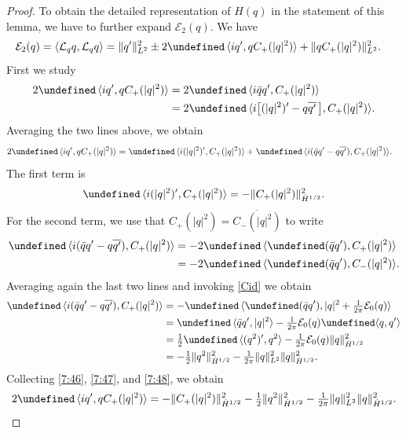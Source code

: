 \documentclass{amsart}
\numberwithin{equation}{section}
\theoremstyle{definition}
\newcommand{\Lc}{\mathcal{L}}
\newcommand{\lan}{\langle}
\newcommand{\ran}{\rangle}
\let\Re=\undefined\DeclareMathOperator{\Re}{Re}
\let\Im=\undefined\DeclareMathOperator{\Im}{Im}
\begin{document}
\begin{proof}
To obtain the detailed representation of $H(q)$ in the statement of this lemma, we have to further expand $\mathcal E_2(q)$.  We have
\begin{align}\label{eqn:E_2_expansion}
\mathcal{E}_2(q)&=\lan \Lc_qq,\Lc_qq\ran=\|q'\|_{L^2}^2\pm 2\Re\,\lan iq',q C_+(|q|^2)\ran+\|q C_+(|q|^2)\|_{L^2}^2.
\end{align}
First we study
\begin{align*}
2\Re\,\lan iq',q C_+(|q|^2)\ran&=2\Re\,\lan i\bar{q}q', C_+(|q|^2)\ran\\
&=2\Re\,\lan i\bigl[(|q|^2)'-q\overline{q'}\,\bigr], C_+(|q|^2)\ran.
\end{align*}
Averaging the two lines above, we obtain
\begin{align}\label{7:46}
2\Re\,\lan iq',q C_+(|q|^2)\ran&=\Re\,\lan i(|q|^2)', C_+(|q|^2)\ran+\Re\,\lan i(\bar{q}q'-q\overline{q'}), C_+(|q|^2)\ran.
\end{align}
The first term is
\begin{align}\label{7:47}
\Re\,\lan i(|q|^2)', C_+(|q|^2)\ran=-\| C_+(|q|^2)\|_{\dot{H}^{1/2}}^2.
\end{align}
For the second term, we use that $ C_+(|q|^2)=\overline{C_-(|q|^2)}$ to write
\begin{align*}
\Re\,\lan i(\bar{q}q'-q\overline{q'}), C_+(|q|^2)\ran
&=-2\Re\,\lan\Im(\bar{q}q'), C_+(|q|^2)\ran\\
&=-2\Re\,\lan\Im(\bar{q}q'),C_-(|q|^2)\ran.
\end{align*}
Averaging again the last two lines and invoking \eqref{Cid} we obtain
\begin{align}\label{7:48}
\Re\, \lan i(\bar{q}q'-q\overline{q'}), C_+(|q|^2)\ran\notag
&=-\Re\,\lan \Im(\bar{q}q'),|q|^2+\tfrac1{2\pi}\mathcal{E}_0(q)\ran\notag\\
&=\Im\,\lan\bar{q}q',|q|^2\ran-\tfrac1{2\pi}\mathcal{E}_0(q)\Im\lan q,q'\ran\notag\\
&=\tfrac12 \Im\,\lan (q^2)',q^2\ran-\tfrac1{2\pi}\mathcal{E}_0(q)\|q\|_{\dot H^{1/2}}^2\notag\\
&=-\tfrac12\|q^2\|_{\dot{H}^{1/2}}^2-\tfrac1{2\pi}\|q\|_{L^2}^2\|q\|_{\dot{H}^{1/2}}^2.
\end{align}
Collecting \eqref{7:46}, \eqref{7:47}, and \eqref{7:48}, we obtain
\begin{align}\label{7:49}
2\Re\,\lan iq',q C_+(|q|^2)\ran=-\| C_+(|q|^2)\|_{\dot{H}^{1/2}}^2-\tfrac12\|q^2\|_{\dot{H}^{1/2}}^2-\tfrac1{2\pi}\|q\|_{L^2}^2\|q\|_{\dot{H}^{1/2}}^2.
\end{align}


\end{proof}
\end{document}
